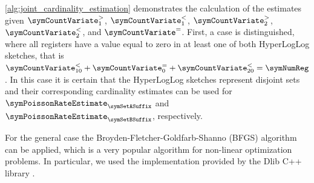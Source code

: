 \documentclass[a4paper]{scrartcl}
\begin{document}
\cref{alg:joint_cardinality_estimation} demonstrates the calculation of the estimates given $\boldsymbol\symCountVariate^{>}_{1}$,
$\boldsymbol\symCountVariate^{<}_{1}$,
$\boldsymbol\symCountVariate^{>}_{2}$,
$\boldsymbol\symCountVariate^{<}_{2}$, and
$\boldsymbol\symCountVariate^{=}$. First, a case is distinguished, where
all registers have a value equal to zero in at least one of both HyperLogLog sketches, that is $\symCountVariate^{<}_{10}+\symCountVariate^{=}_0+\symCountVariate^{<}_{20} = \symNumReg$. In this case it is certain that the HyperLogLog sketches represent disjoint sets and their corresponding  cardinality estimates can be  used for $\symPoissonRateEstimate_{\symSetASuffix}$ and $\symPoissonRateEstimate_{\symSetBSuffix}$, respectively.




For the general case the Broyden-Fletcher-Goldfarb-Shanno (BFGS) algorithm \cite{Press2007} can be applied, which is a very popular algorithm for non-linear optimization problems. In particular, we used the implementation provided by the Dlib C++ library \cite{King2009}.
\end{document}
